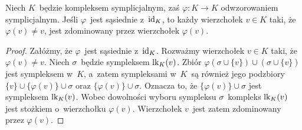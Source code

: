 \begin{comment}
\begin{lem}[por. {\cite[Propositions 2.7, 2.9]{Barmak12}}]\label{lem-Ctriang-rdzenie-charakteryzacja}
Załóżmy, że kompleks symplicjalny $K$~nie zawiera nieskończonego sympleksu. Następujące warunki są równoważne:
\begin{compactitem}
\item[1)] $K$~jest $\mCtriang$-rdzeniem;
\item[2)] nie istnieje zdominowany wierzchołek $v\in K$, tzn.~$K$~jest $\mItriang$-rdzeniem;
\item[3)] nie istnieje odwzorowanie symplicjalne $\phi\colon K\to K$ takie, że $\phi\stackrel{\triangle}{\sim}\id_K$ oraz $\phi\not=\id_K$.
\end{compactitem}
\end{lem}
\begin{proof}
1)$\implies$2)\,: Oczywiste, gdyż $\mItriang\subseteq \mCtriang$.

2)$\implies$3)\,: Załóżmy, że $K$~nie zawiera zdominowanego wierzchołka. Niech $\phi\colon K\to K$ będzie odwzorowaniem symplicjalnym sąsiednim $\id_K$. Ustalmy dowolny wierzchołek $v\in K$. Niech $\sigma$~będzie dowolnym maksymalnym sympleksem zawierającym $v$. Zbiór $\phi(\sigma)\cup\sigma$ jest sympleksem w~$K$. Wobec maksymalności $\sigma$~zachodzi równość $\sigma\cup\phi(\sigma)=\sigma$, stąd $\phi(v)\in \sigma$. Wierzchołek $\phi(v)$~należy wobec dowolności wyboru $\sigma$~do każdego maksymalnego sympleksu zawierającego $v$. Ponieważ $K$~nie zawiera zdominowanego wierzchołka, ma miejsce równość $v=\phi(v)$. Wobec dowolności wyboru wierzchołka $v$~otrzymujemy $\phi=\id_K$. Zatem jedynym odwzorowaniem należącym do klasy sąsiedztwa $\id_K$ jest $\id_K$.

3)$\implies$1)\,: Oczywiste.
\end{proof}
\end{comment}

\begin{lem}\label{lem-odwz_sasiednie_wierzcholek_zdominowany}
Niech $K$~będzie kompleksem symplicjalnym, zaś $\varphi\colon K\to K$ odwzorowaniem symplicjalnym. Jeśli $\varphi$~jest sąsiednie z~$\operatorname{id}_K$, to każdy wierzchołek $v\in K$ taki, że $\varphi(v)\not=v$, jest zdominowany przez wierzchołek $\varphi(v)$.
\end{lem}
\begin{proof}
Załóżmy, że $\varphi$~jest sąsiednie z~$\operatorname{id}_K$. Rozważmy wierzchołek $v\in K$ taki, że $\varphi(v)\not=v$. Niech $\sigma$~będzie sympleksem $\operatorname{lk}_K(v)$. Zbiór $\varphi(\sigma\cup\{v\})\cup(\sigma\cup\{v\})$ jest sympleksem w~$K$, a~zatem sympleksami w~$K$~są również jego podzbiory $\{v\}\cup \{\varphi(v)\}\cup\sigma$ oraz $\{\varphi(v)\}\cup\sigma$. Oznacza to, że $\{\varphi(v)\}\cup\sigma$ jest sympleksem $\operatorname{lk}_K(v)$. Wobec dowolności wyboru sympleksu $\sigma$~kompleks $\operatorname{lk}_K(v)$ jest stożkiem o~wierzchołku $\varphi(v)$. Wierzchołek $v$~jest zatem zdominowany przez $\varphi(v)$.
\end{proof}

